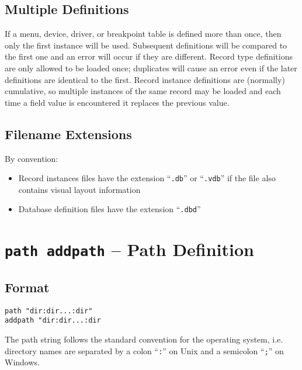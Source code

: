 \subsection{Multiple Definitions}

If a menu, device, driver, or breakpoint table is defined more than once, then only the first instance will be used.
Subsequent definitions will be compared to the first one and an error will occur if they are different.
Record type definitions are only allowed to be loaded once; duplicates will cause an error even if the later definitions are identical to the first.
Record instance definitions are (normally) cumulative, so multiple instances of the same record may be loaded and each time a field value is encountered it replaces the previous value.

\subsection{Filename Extensions}

By convention:

\begin{itemize}
\item Record instances files have the extension ``\verb|.db|'' or ``\verb|.vdb|'' if the file also contains visual layout information

\item Database definition files have the extension ``\verb|.dbd|''

\end{itemize}

\section{\texttt{path addpath} -- Path Definition}

\subsection{Format}

\begin{verbatim}
path "dir:dir...:dir"
addpath "dir:dir...:dir
\end{verbatim}

The path string follows the standard convention for the operating system, i.e. directory names are separated by a colon ``\verb|:|'' on Unix
and a semicolon ``\verb|;|'' on Windows.

